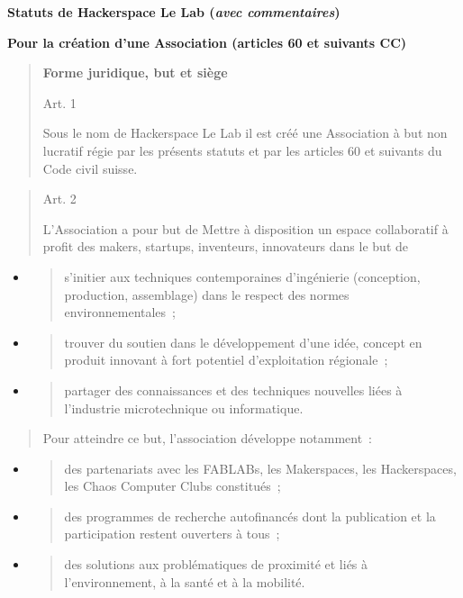 \documentclass[10pt]{article}
\author{Steve Huguenin-Elie}
\date{\today}
\providecommand{\tightlist}{%
  \setlength{\itemsep}{0pt}\setlength{\parskip}{0pt}}
\begin{document}

\textbf{Statuts de Hackerspace Le Lab (\emph{avec commentaires})}

\textbf{Pour la création d'une Association (articles 60 et suivants CC)}

\begin{quote}
\textbf{Forme juridique, but et siège}

Art. 1

Sous le nom de Hackerspace Le Lab il est créé une Association à but non lucratif
régie par les présents statuts et par les articles 60 et suivants du
Code civil suisse.

\end{quote}
\begin{quote}
Art. 2

L'Association a pour but de Mettre à disposition un espace collaboratif à profit des makers, startups, inventeurs, innovateurs dans le but de
\end{quote}
\begin{itemize}
  \tightlist
  \item
  \begin{quote}
    s'initier aux techniques contemporaines d'ingénierie (conception, production, assemblage) dans le respect des normes environnementales~;
  \end{quote}
  \item
  \begin{quote}
    trouver du soutien dans le développement d'une idée, concept en produit innovant à fort potentiel d'exploitation régionale~;
  \end{quote}
  \item
  \begin{quote}
    partager des connaissances et des techniques nouvelles liées à l'industrie microtechnique ou informatique.
  \end{quote}
\end{itemize}

\begin{quote}
Pour atteindre ce but, l'association développe notamment~:
\end{quote}
\begin{itemize}
  \tightlist
  \item \begin{quote}
    des partenariats avec les FABLABs, les Makerspaces, les Hackerspaces, les Chaos Computer Clubs constitués~;
  \end{quote}
  \item \begin{quote}
    des programmes de recherche autofinancés dont la publication et la participation restent ouverters à tous~;
  \end{quote}
  \item \begin{quote}
    des solutions aux problématiques de proximité et liés à l'environnement, à la santé et à la mobilité.
  \end{quote}
\end{itemize}
\end{document}
